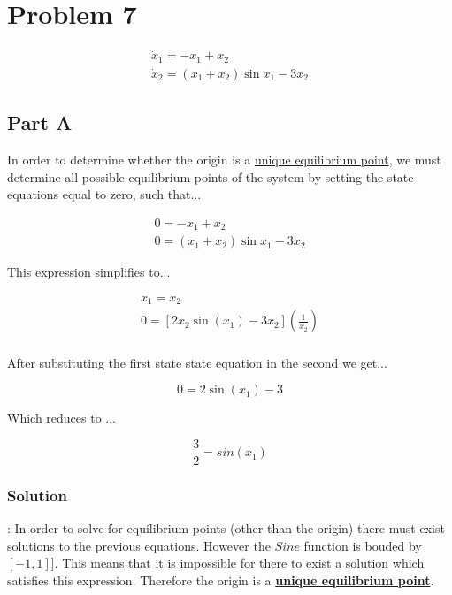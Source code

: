 \section*{Problem 7}



$$
\begin{array}{l}
\dot{x}_{1}=-x_{1}+x_{2} \\
\dot{x}_{2}=\left(x_{1}+x_{2}\right) \sin x_{1}-3 x_{2}
\end{array}
$$


\subsection*{Part A}

In order to determine whether the origin is a \underline{unique equilibrium point}, we must determine all possible equilibrium points of the system by setting the state equations equal to zero, such that...

$$
\begin{array}{l}
0 =-x_{1}+x_{2} \\
0 =\left(x_{1}+x_{2}\right) \sin x_{1}-3 x_{2}
\end{array}
$$

\noindent This expression simplifies to...

$$
\begin{array}{l}
x_{1}=x_{2} \\
0=\left[2 x_{2} \sin \left(x_{1}\right)-3 x_{2}\right]\left(\frac{1}{x_{2}}\right) \\
\end{array}
$$


\noindent After substituting the first state state equation in the second we get...

$$
0=2 \sin \left(x_{1}\right)-3
$$

\noindent Which reduces to ...

$$
\frac{3}{2} = sin(x_1)
$$

\subsubsection*{Solution}: In order to solve for equilibrium points (other than the origin) there must exist solutions to the previous equations. However the $Sine$ function is bouded by $[-1, 1]]$. This means that it is impossible for there to exist a solution which satisfies this expression. Therefore the origin is a \underline{\textbf{unique equilibrium point}}.


